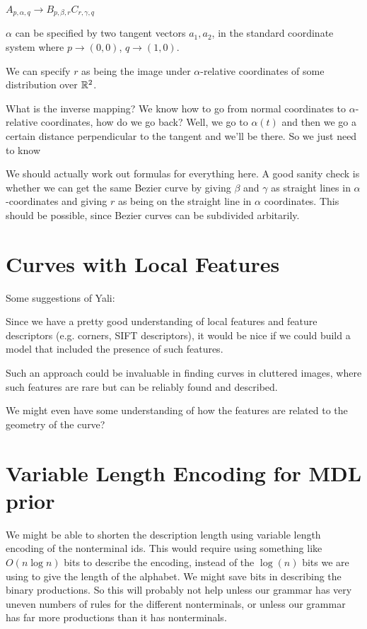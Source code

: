 \documentclass{article}
\begin{document}
$ A_{p, \alpha, q} \to B_{p, \beta, r} C_{r, \gamma, q}$

$\alpha$ can be specified by two tangent vectors $a_1, a_2$, in the
standard coordinate system where $p \to (0,0)$, $q\to (1,0)$.

We can specify $r$ as being the image under $\alpha$-relative
coordinates of some distribution over $\mathbb{R}^2$.

What is the inverse mapping? We know how to go from normal coordinates
to $\alpha$-relative coordinates, how do we go back? Well, we go to
$\alpha(t)$ and then we go a certain distance perpendicular to the
tangent and we'll be there. So we just need to know 

We should actually work out formulas for everything here.  A good
sanity check is whether we can get the same Bezier curve by giving
$\beta$ and $\gamma$ as straight lines in $\alpha$-coordinates and
giving $r$ as being on the straight line in $\alpha$ coordinates.
This should be possible, since Bezier curves can be subdivided arbitarily.

\section{Curves with Local Features}

Some suggestions of Yali:

Since we have a pretty good understanding of local features and
feature descriptors (e.g. corners, SIFT descriptors), it would be nice
if we could build a model that included the presence of such features.

Such an approach could be invaluable in finding curves in cluttered
images, where such features are rare but can be reliably found and
described.

We might even have some understanding of how the features are related
to the geometry of the curve?

\section{Variable Length Encoding for MDL prior}
We might be able to shorten the description length using variable
length encoding of the nonterminal ids. This would require using
something like $O(n\log n)$ bits to describe the encoding, instead of
the $\log(n)$ bits we are using to give the length of the alphabet. We
might save bits in describing the binary productions. So this will
probably not help unless our grammar has very uneven numbers of rules
for the different nonterminals, or unless our grammar has far more
productions than it has nonterminals.
\end{document}
